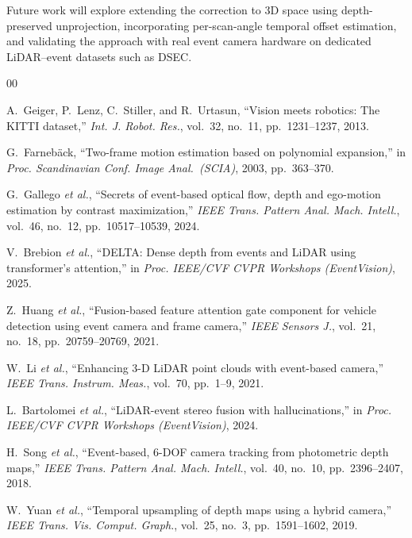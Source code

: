 \documentclass[conference]{IEEEtran}
\begin{document}
Future work will explore extending the correction to 3D space using
depth-preserved unprojection, incorporating per-scan-angle temporal
offset estimation, and validating the approach with real event camera
hardware on dedicated LiDAR--event datasets such as DSEC.

\begin{thebibliography}{00}

A.~Geiger, P.~Lenz, C.~Stiller, and R.~Urtasun,
``Vision meets robotics: The KITTI dataset,''
\textit{Int. J. Robot. Res.}, vol.~32, no.~11,
pp.~1231--1237, 2013.

G.~Farneb{\"a}ck,
``Two-frame motion estimation based on polynomial expansion,''
in \textit{Proc. Scandinavian Conf. Image Anal.\ (SCIA)}, 2003,
pp.~363--370.

G.~Gallego \textit{et al.},
``Secrets of event-based optical flow, depth and ego-motion
estimation by contrast maximization,''
\textit{IEEE Trans. Pattern Anal. Mach. Intell.}, vol.~46, no.~12,
pp.~10517--10539, 2024.

V.~Brebion \textit{et al.},
``DELTA: Dense depth from events and LiDAR using transformer's
attention,''
in \textit{Proc. IEEE/CVF CVPR Workshops (EventVision)}, 2025.

Z.~Huang \textit{et al.},
``Fusion-based feature attention gate component for vehicle
detection using event camera and frame camera,''
\textit{IEEE Sensors J.}, vol.~21, no.~18,
pp.~20759--20769, 2021.

W.~Li \textit{et al.},
``Enhancing 3-D LiDAR point clouds with event-based camera,''
\textit{IEEE Trans. Instrum. Meas.}, vol.~70, pp.~1--9, 2021.

L.~Bartolomei \textit{et al.},
``LiDAR-event stereo fusion with hallucinations,''
in \textit{Proc. IEEE/CVF CVPR Workshops (EventVision)}, 2024.

H.~Song \textit{et al.},
``Event-based, 6-DOF camera tracking from photometric depth maps,''
\textit{IEEE Trans. Pattern Anal. Mach. Intell.}, vol.~40, no.~10,
pp.~2396--2407, 2018.

W.~Yuan \textit{et al.},
``Temporal upsampling of depth maps using a hybrid camera,''
\textit{IEEE Trans. Vis. Comput. Graph.}, vol.~25, no.~3,
pp.~1591--1602, 2019.

\end{thebibliography}
\end{document}
